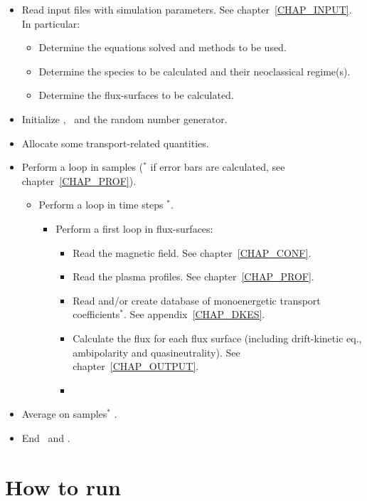 \begin{itemize}
 \item Read input files with simulation parameters. See chapter~\ref{CHAP_INPUT}. In particular:
 \begin{itemize}
  \item Determine the equations solved and methods to be used.
  \item Determine the species to be calculated and their neoclassical regime(s).
  \item Determine the flux-surfaces to be calculated.
 \end{itemize}
   \item Initialize \MPI, \PETSC~and the random number generator.
  \item Allocate some transport-related quantities.
  \item Perform a loop in samples ($^*$ if error bars are calculated, see chapter~\ref{CHAP_PROF}).
    \begin{itemize}
    \item Perform a loop in time steps $^*$.
      \begin{itemize}
      \item Perform a first loop in flux-surfaces:
        \begin{itemize}
        \item Read the magnetic field. See chapter~\ref{CHAP_CONF}.
        \item Read the plasma profiles. See chapter~\ref{CHAP_PROF}.
        \item Read and/or create database of monoenergetic transport coefficients$^*$. See appendix~\ref{CHAP_DKES}.
        \item Calculate the flux for each flux surface (including drift-kinetic eq., ambipolarity and quasineutrality). See chapter~\ref{CHAP_OUTPUT}.
        \item {}
        \end{itemize}
      \end{itemize}
    \end{itemize}
    \item Average on samples$^*$ .
  \item End \MPI~and \PETSC.
\end{itemize}



\section{How to run \KNOSOS}

